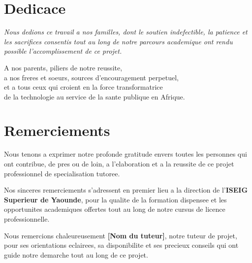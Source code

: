 \documentclass[12pt,a4paper]{report}
\begin{document}
\chapter*{Dedicace}
\thispagestyle{plain}

\vspace{3cm}

\begin{flushright}
\begin{minipage}{0.65\textwidth}
\itshape
Nous dedions ce travail a nos familles, dont le soutien indefectible, la patience et les sacrifices consentis tout au long de notre parcours academique ont rendu possible l'accomplissement de ce projet.

\bigskip
A nos parents, piliers de notre reussite,\\
a nos freres et soeurs, sources d'encouragement perpetuel,\\
et a tous ceux qui croient en la force transformatrice\\
de la technologie au service de la sante publique en Afrique.
\end{minipage}
\end{flushright}

\chapter*{Remerciements}
\thispagestyle{plain}

Nous tenons a exprimer notre profonde gratitude envers toutes les personnes qui ont contribue, de pres ou de loin, a l'elaboration et a la reussite de ce projet professionnel de specialisation tutoree.

\bigskip
Nos sinceres remerciements s'adressent en premier lieu a la direction de l'\textbf{ISEIG Superieur de Yaounde}, pour la qualite de la formation dispensee et les opportunites academiques offertes tout au long de notre cursus de licence professionnelle.

\bigskip
Nous remercions chaleureusement \textbf{[Nom du tuteur]}, notre tuteur de projet, pour ses orientations eclairees, sa disponibilite et ses precieux conseils qui ont guide notre demarche tout au long de ce projet.
\end{document}
